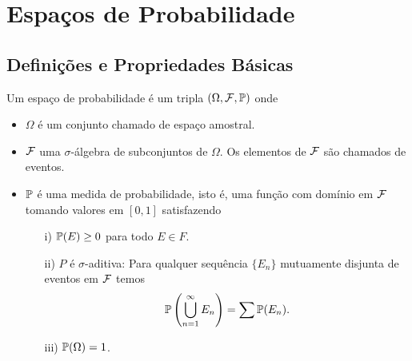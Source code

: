 \chapter[Aula 4]{Espaços de Probabilidade}
\chaptermark{}





\section{Definições e Propriedades Básicas}

Um espaço de probabilidade é um tripla 
$(\Omega,\F,\P)$ onde 
\begin{itemize}
	\item 
	$\Omega$ é um conjunto chamado de espaço amostral.

	\item
	$\F$ uma $\sigma$-álgebra de subconjuntos de $\Omega$.
	Os elementos de $\F$ são chamados de eventos.
	
	\item $\P$ é uma medida de probabilidade, isto é, 
	uma função com domínio em $\F$ tomando valores em 
	$[0,1]$ satisfazendo 
		\begin{itemize}
			\item[i)] 
			$\P(E)\geq 0$ para todo $E\in F$.

			\item[ii)] 
			$P$ é $\sigma$-aditiva: Para qualquer
			sequência $\{E_n\}$ mutuamente disjunta 
			de eventos em $\F$ temos 
				\[
					\P\left( \bigcup_{n=1}^{\infty} E_n \right)
					=
					\sum \P(E_n).
				\]
			\item[iii)] 
			$\P(\Omega)=1$.
		\end{itemize}
\end{itemize}



